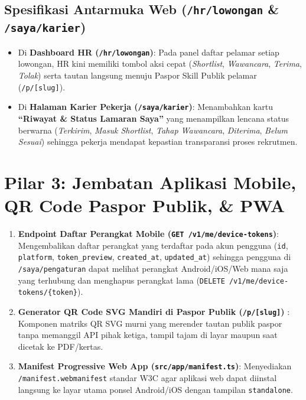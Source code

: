 \documentclass[11pt,a4paper]{report}
\begin{document}
\subsection{Spesifikasi Antarmuka Web (\texttt{/hr/lowongan} \& \texttt{/saya/karier})}
\begin{itemize}[leftmargin=1.5em]
    \item Di \textbf{Dashboard HR (\texttt{/hr/lowongan})}: Pada panel daftar pelamar setiap lowongan, HR kini memiliki tombol aksi cepat (\textit{Shortlist}, \textit{Wawancara}, \textit{Terima}, \textit{Tolak}) serta tautan langsung menuju Paspor Skill Publik pelamar (\texttt{/p/[slug]}).
    \item Di \textbf{Halaman Karier Pekerja (\texttt{/saya/karier})}: Menambahkan kartu \textbf{``Riwayat \& Status Lamaran Saya''} yang menampilkan lencana status berwarna (\textit{Terkirim}, \textit{Masuk Shortlist}, \textit{Tahap Wawancara}, \textit{Diterima}, \textit{Belum Sesuai}) sehingga pekerja mendapat kepastian transparansi proses rekrutmen.
\end{itemize}

\section{Pilar 3: Jembatan Aplikasi Mobile, QR Code Paspor Publik, \& PWA}
\begin{enumerate}[leftmargin=1.5em]
    \item \textbf{Endpoint Daftar Perangkat Mobile (\texttt{GET /v1/me/device-tokens})}: Mengembalikan daftar perangkat yang terdaftar pada akun pengguna (\texttt{id}, \texttt{platform}, \texttt{token\_preview}, \texttt{created\_at}, \texttt{updated\_at}) sehingga pengguna di \texttt{/saya/pengaturan} dapat melihat perangkat Android/iOS/Web mana saja yang terhubung dan menghapus perangkat lama (\texttt{DELETE /v1/me/device-tokens/\{token\}}).
    \item \textbf{Generator QR Code SVG Mandiri di Paspor Publik (\texttt{/p/[slug]})} : Komponen matriks QR SVG murni yang merender tautan publik paspor tanpa memanggil API pihak ketiga, tampil tajam di layar maupun saat dicetak ke PDF/kertas.
    \item \textbf{Manifest Progressive Web App (\texttt{src/app/manifest.ts})}: Menyediakan \texttt{/manifest.webmanifest} standar W3C agar aplikasi web dapat diinstal langsung ke layar utama ponsel Android/iOS dengan tampilan \texttt{standalone}.
\end{enumerate}
\end{document}
